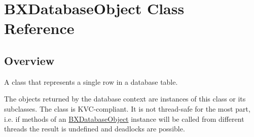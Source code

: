 \hypertarget{interface_b_x_database_object}{}\section{B\+X\+Database\+Object Class Reference}
\label{interface_b_x_database_object}


\subsection{Overview}
A class that represents a single row in a database table. 

The objects returned by the database context are instances of this class or its subclasses. The class is K\+V\+C-\/compliant. It is not thread-\/safe for the most part, i.\+e. if methods of an \hyperlink{interface_b_x_database_object}{B\+X\+Database\+Object} instance will be called from different threads the result is undefined and deadlocks are possible.

